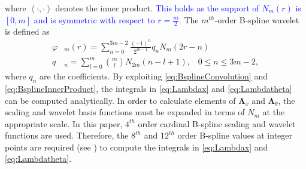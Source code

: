 \documentclass[journal]{IEEEtran}
\newcommand{\parham}[1]{\textcolor{blue}{#1}}
\begin{document}
where $\left\langle \cdot,\cdot\right\rangle $ denotes the inner product. \parham{This holds as the support of $N_m\left(r\right)$ is $\left[ 0,m\right]$ and  is symmetric with respect to $r=\frac{m}{2}$.} The $m^{th}$-order B-spline wavelet is defined as \cite{Chui1992}
\begin{align}
 \varphi & _{m}\left(r\right) = \sum_{n=0}^{3m-2} \frac{\left(-1\right)^n}{2^{m-1}}  q_n N_{m}\left(2r-n\right) \\
 q & _n = \sum_{l=0}^{m} \binom{m}{l} N_{2m}\left(n-l+1\right), \,  \text{ $0\le n\le 3m-2$},
\end{align}
where $q_n$ are the coefficients. By exploiting \eqref{eq:BsplineConvolution} and \eqref{eq:BsplineInnerProduct}, the integrals in \eqref{eq:Lambdax} and \eqref{eq:Lambdatheta} can be computed analytically. In order to calculate elements of $\boldsymbol\Lambda_{x}$ and $\boldsymbol\Lambda_{\theta}$, the scaling and wavelet basis functions must be expanded in terms of $N_m$ at the appropriate scale. In this paper, $4^{th}$ order cardinal B-spline scaling and wavelet functions are used. Therefore, the $8^{th}$ and $12^{th}$ order B-spline values at integer points are required (see \cite{Goswami1999}) to compute the integrals in \eqref{eq:Lambdax} and \eqref{eq:Lambdatheta}.
\end{document}
